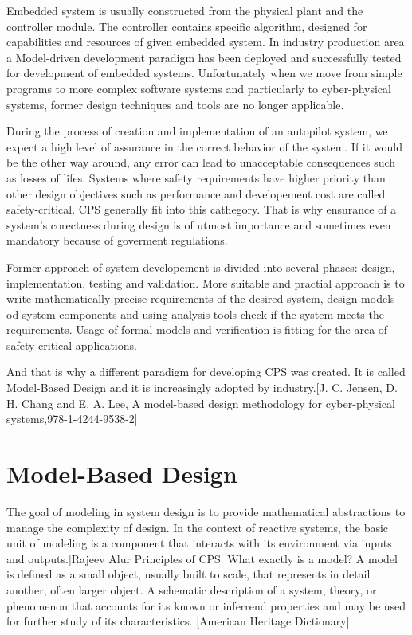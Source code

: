 Embedded system is usually constructed from the physical plant and the controller module. The controller contains specific algorithm, designed for capabilities and resources of given embedded system. In industry production area a Model-driven development paradigm has been deployed and successfully tested for development of embedded systems. Unfortunately when we move from simple programs to more complex software systems and particularly to cyber-physical systems, former design techniques and tools are no longer applicable.

During the process of creation and implementation of an autopilot system, we expect a high level of assurance in the correct behavior of the system. If it would be the other way around, any error can lead to unacceptable consequences such as losses of lifes. Systems where safety requirements have higher priority than other design objectives such as performance and developement cost are called safety-critical. CPS generally fit into this cathegory. That is why ensurance of a system's corectness during design is of utmost importance and sometimes even mandatory because of goverment regulations.


Former approach of system developement is divided into several phases: design, implementation, testing and validation. More suitable and practial approach is to write mathematically precise requirements of the desired system, design models od system components and using analysis tools check if the system meets the requirements. Usage of formal models and verification is fitting for the area of safety-critical applications. 

And that is why a different paradigm for developing CPS was created. It is called Model-Based Design and it is increasingly adopted by industry.[J. C. Jensen, D. H. Chang and E. A. Lee, A model-based design methodology for cyber-physical systems,978-1-4244-9538-2]

\section{Model-Based Design}

The goal of modeling in system design is to provide mathematical abstractions to manage the complexity of design. In the context of reactive systems, the basic unit of modeling is a component that interacts with its environment via inputs and outputs.[Rajeev Alur Principles of CPS] What exactly is a model? A model is defined as a small object, usually built to scale, that represents in detail another, often larger object. A schematic description of a system, theory, or phenomenon that accounts for its known or inferrend properties and may be used for further study of its characteristics. [American Heritage Dictionary]

